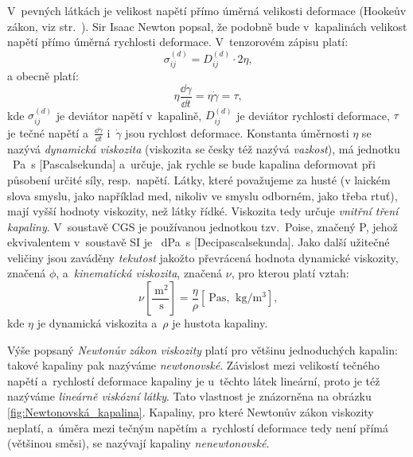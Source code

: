 \documentclass[12pt]{article}
\begin{document}
V~pevných látkách je velikost napětí přímo úměrná velikosti deformace (Hookeův zákon, viz str.~\pageref{sec:Hookeův_zákon}). Sir Isaac Newton popsal, že podobně bude v~kapalinách velikost napětí přímo úměrná rychlosti deformace. V~tenzorovém zápisu platí:
\begin{equation}
    \sigma_{ij}^{(d)} = D_{ij}^{(d)}\cdot 2\eta\text{,}
\end{equation}
a obecně platí:~\cite{thesis:Viskozimetr_pro_viskozni_materialy}
\begin{equation}
    \eta\frac{\dd\gamma}{\dd t} = \eta\dot\gamma = \tau\text{,}
    \label{eq:Newtonův zákon viskozity}
\end{equation}
kde $\sigma_{ij}^{(d)}$ je deviátor napětí v~kapalině, $D_{ij}^{(d)}$ je deviátor rychlosti deformace, $\tau$ je tečné napětí a~$\frac{\dd\gamma}{\dd t}$ i~$\dot\gamma$ jsou rychlost deformace. Konstanta úměrnosti $\eta$ se nazývá \emph{dynamická viskozita} (viskozita se česky též nazývá \emph{vazkost}), má jednotku \SI{}{\pascal\second} [Pascalsekunda] a~určuje, jak rychle se bude kapalina deformovat při působení určité síly, resp.~napětí. Látky, které považujeme za husté (v laickém slova smyslu, jako například med, nikoliv ve smyslu odborném, jako třeba rtuť), mají vyšší hodnoty viskozity, než látky řídké. Viskozita tedy určuje \emph{vnitřní tření kapaliny}. V~soustavě CGS je používanou jednotkou tzv.~Poise, značený P, jehož ekvivalentem v~soustavě SI je \SI{}{\deci\pascal\second} [Decipascalsekunda]\footnotemark. Jako další užitečné veličiny jsou zaváděny \emph{tekutost} jakožto převrácená hodnota dynamické viskozity, značená $\phi$, a~\emph{kinematická viskozita}, značená $\nu$, pro kterou platí vztah:~\cite{wiki:Viskozita}
\begin{equation}
    \nu\left[\frac{\SI{}{\metre\squared}}{\SI{}{\second}}\right]= \frac{\eta}{\rho}\left[\SI{}{\pascal\second}\text{, }\SI{}{\kilo\gram\per\metre\cubed}\right]\text{,}
\end{equation}
kde $\eta$ je dynamická viskozita a~$\rho$ je hustota kapaliny.
\par
{}
Výše popsaný \emph{Newtonův zákon viskozity} platí pro většinu jednoduchých kapalin: takové kapaliny pak nazýváme \emph{newtonovské}. Závislost mezi velikostí tečného napětí a~rychlostí deformace kapaliny je u~těchto látek lineární, proto je též nazýváme \emph{lineárně viskózní látky}. Tato vlastnost je znázorněna na obrázku \ref{fig:Newtonovská_kapalina}. Kapaliny, pro které Newtonův zákon viskozity neplatí, a~úměra mezi tečným napětím a~rychlostí deformace tedy není přímá (většinou směsi), se nazývají kapaliny \emph{nenewtonovské}.~\cite{online:Skripta_viskozni_latky}\cite{wiki:Newtonská_tekutina}
\end{document}
